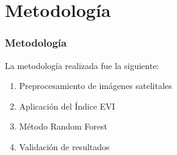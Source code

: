 \section{Metodología}

\begin{frame}
	\frametitle{Metodología}
	La metodología realizada fue la siguiente:
	
	\begin{enumerate}
		\item Preprocesamiento de imágenes satelitales 
		\item Aplicación del Índice EVI 
		\item Método Random Forest
		\item Validación de resultados
	\end{enumerate}
\end{frame}

